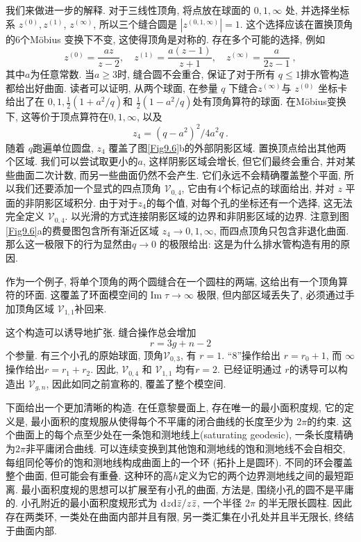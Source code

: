 我们来做进一步的解释. 对于三线性顶角, 将点放在球面的 $0,1, \infty$ 处, 并选择坐标系 $z^{(0)}, z^{(1)}$, $z^{(\infty)}$, 
所以三个缝合圆是 $|z^{(0,1, \infty)}|=1$. 这个选择应该在置换顶角的6个Möbius 变换下不变, 这使得顶角是对称的. 存在多个可能的选择, 例如
\begin{equation}
	z^{(0)}=\frac{a z}{z-2}, \quad z^{(1)}=\frac{a(z-1)}{z+1}, \quad z^{(\infty)}=\frac{a}{2 z-1} \:, \label{9.3.6}
\end{equation}
其中$a$为任意常数. 当$a \geq 3$时, 缝合圆不会重合, 保证了对于所有 $q \leq 1$排水管构造都给出好曲面. 读者可以证明, 从两个球面, 
在参量 $q$ 下缝合$z^{(\infty)}$与 $z^{(0)}$ 坐标卡给出了在 $0,1, \frac{1}{2}(1+a^{2}/q)$和 $\frac{1}{2}(1-a^{2}/q)$处有顶角算符的球面. 
在Möbius变换下, 这等价于顶点算符在$0,1, \infty$, 以及
\begin{equation}
	z_{4}=(q-a^{2})^{2}/4 a^{2} q \:. \label{9.3.7}
\end{equation}
随着 $q$跑遍单位圆盘, $z_{4}$ 覆盖了图\ref{Fig9.6}b的外部阴影区域. 置换顶点给出其他两个区域. 
我们可以尝试取更小的$a$, 这样阴影区域会增长, 但它们最终会重合, 并对某些曲面二次计数, 而另一些曲面仍然不会产生. 
它们永远不会精确覆盖整个平面, 所以我们还要添加一个显式的四点顶角 $\mathscr{V}_{0,4}$, 它由有4个标记点的球面给出, 
并对 $z$ 平面的非阴影区域积分. 由于对于$z_{4} $的每个值, 对每个孔的坐标还有一个选择, 这无法完全定义 $\mathscr{V}_{0,4}$. 
以光滑的方式连接阴影区域的边界和非阴影区域的边界. 注意到图\ref{Fig9.6}a的费曼图包含所有渐近区域 $z_{4} \rightarrow 0,1, \infty$, 
而四点顶角只包含非退化曲面. 那么这一极限下的行为显然由$q \rightarrow 0$ 的极限给出: 这是为什么排水管构造有用的原因.

作为一个例子, 将单个顶角的两个圆缝合在一个圆柱的两端, 这给出有一个顶角算符的环面. 这覆盖了环面模空间的$\operatorname{Im} \tau \rightarrow \infty$ 极限, 但内部区域丢失了, 必须通过手加顶角区域 $\mathscr{V}_{1,1}$补回来.

这个构造可以诱导地扩张. 缝合操作总会增加
\begin{equation}
	r = 3g + n - 2  \label{9.3.8}
\end{equation}
个参量. 有三个小孔的原始球面, 顶角$\mathscr{V}_{0,3}$, 有 $r=1$. ``8''操作给出 $r=r_{0}+1$, 而 $\infty$ 操作给出$r=r_{1}+r_{2}$. 
因此, $\mathscr{V}_{0,4}$ 和 $\mathscr{V}_{1,1}$ 均有$r=2$. 已经证明通过 $r$的诱导可以构造出 $\mathscr{V}_{g, n}$, 
因此如同之前宣称的, 覆盖了整个模空间.

下面给出一个更加清晰的构造. 在任意黎曼面上, 存在唯一的最小面积度规, 它的定义是, 最小面积的度规服从使得每个不平庸的闭合曲线的长度至少为 $2 \pi$的约束. 
这个曲面上的每个点至少处在一条饱和测地线上(saturating geodesic), 一条长度精确为$2 \pi$非平庸闭合曲线. 
可以连续变换到其他饱和测地线的饱和测地线不会自相交, 每组同伦等价的饱和测地线构成曲面上的一个环 (拓扑上是圆环). 
不同的环会覆盖整个曲面, 但可能会有重叠. 这种环的高$h$定义为它的两个边界测地线之间的最短距离. 最小面积度规的思想可以扩展至有小孔的曲面, 
方法是, 围绕小孔的圆不是平庸的. 小孔附近的最小面积度规形式为 $\mathrm{d} z \mathrm{d} \bar{z} / z \bar{z}$, 一个半径 $2 \pi $ 的半无限长圆柱. 
因此存在两类环, 一类处在曲面内部并且有限, 另一类汇集在小孔处并且半无限长, 终结于曲面内部.

